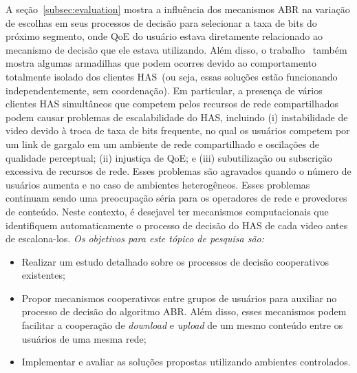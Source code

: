 A seção~\ref{subsec:evaluation} mostra a influência dos mecanismos ABR na variação de escolhas em seus processos de decisão para selecionar a taxa de bits do próximo segmento, onde QoE do usuário estava diretamente relacionado ao mecanismo de decisão que ele  estava utilizando. Além disso, o trabalho~\cite{bentaleb:2018:MSys} também mostra algumas armadilhas que podem ocorres devido ao comportamento totalmente isolado dos clientes HAS~(ou seja, essas soluções estão funcionando independentemente, sem coordenação). Em particular, a presença de vários clientes HAS simultâneos que competem pelos recursos de rede compartilhados podem causar problemas de escalabilidade do HAS, incluindo (i) instabilidade de video devido à troca de taxa de bits frequente, no qual os usuários competem por um link de gargalo em um ambiente de rede compartilhado e oscilações de qualidade perceptual; (ii) injustiça de QoE; e (iii) subutilização ou subscrição excessiva de recursos de rede. Esses problemas são agravados quando o número de usuários aumenta e no caso de ambientes heterogêneos. Esses problemas continuam sendo uma preocupação séria para os operadores de rede e provedores de conteúdo. 
Neste contexto, é desejavel ter mecanismos computacionais que identifiquem automaticamente o processo de decisão do HAS de cada video antes de escalona-los.
\emph{Os objetivos para este tópico de pesquisa são:}

\begin{itemize}
    \item Realizar um estudo detalhado sobre os processos de decisão cooperativos existentes;
    \item Propor mecanismos cooperativos entre grupos de usuários para auxiliar no processo de decisão do algoritmo ABR. Além disso, esses mecanismos podem facilitar a cooperação de \textit{download} e \textit{upload} de um mesmo conteúdo entre os usuários de uma mesma rede; 
    \item Implementar e avaliar as soluções propostas utilizando ambientes controlados.
\end{itemize}


